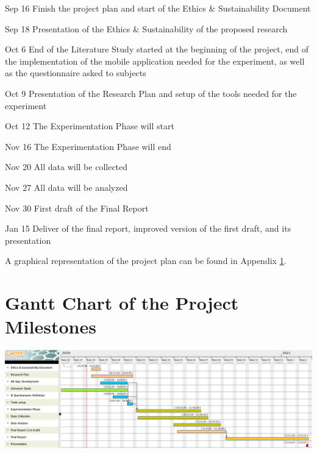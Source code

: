 \documentclass[12pt,twoside,english]{article}
\begin{document}
\begin{description}
\item{Sep 16} Finish the project plan and start of the Ethics \& Sustainability Document

\item {Sep 18} Presentation of the Ethics \& Sustainability of the proposed research

\item {Oct 6} End of the Literature Study started at the beginning of the project, end of the implementation of the mobile application needed for the experiment, as well as the questionnaire asked to subjects

\item {Oct 9} Presentation of the Research Plan and setup of the tools needed for the experiment

\item {Oct 12} The Experimentation Phase will start

\item {Nov 16} The Experimentation Phase will end

\item {Nov 20} All data will be collected

\item {Nov 27} All data will be analyzed

\item {Nov 30} First draft of the Final Report

\item {Jan 15} Deliver of the final report, improved version of the first draft, and its presentation

\end{description}

A graphical representation of the project plan can be found in Appendix \ref{sect:gantt_chart}.




\appendix
\section{Gantt Chart of the Project Milestones}
\label{sect:gantt_chart}

\includegraphics[width=\textwidth]{imgs/project_milestones}
\end{document}
